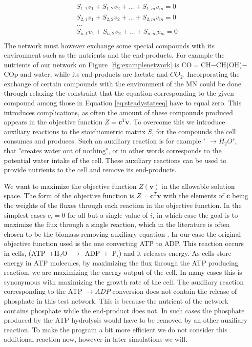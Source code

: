 \documentclass[a4paper,12pt]{article}
\begin{document}
	\begin{equation}\label{eq:steadystateeq}
		\begin{matrix}
			S_{1,1} v_1 + S_{1,2} v_2 + ... + S_{1,m} v_m=0 \\
			S_{2,1} v_1 + S_{2,2} v_2 + ... + S_{2,m} v_m=0 \\
			... \\
			S_{n,1} v_1 + S_{n,2} v_2 + ... + S_{n,m} v_m=0 \\
		\end{matrix}
	\end{equation}
	The network must however exchange some special compounds with its environment such as the nutrients and the end-products. For example the nutrients of our network on Figure~\ref{fig:examplenetwork} is CO$=$CH$-$CH(OH)$-$COp and water, while its end-products are lactate and $CO_2$. Incorporating the exchange of certain compounds with the environment of the MN could be done through relaxing the constraint that the equation corresponding to the given compound among those in Equation \ref{eq:steadystateeq} have to equal zero. This introduces complications, as often the amount of these compounds produced appears in the objective function $Z=\mathbf{c}^T \mathbf{v}$. To overcome this we introduce auxiliary reactions to the stoichiometric matrix $S$, for the compounds the cell consumes and produces. Such an auxiliary reaction is for example " $ \rightarrow H_2O$", that "creates water out of nothing", or in other words corresponds to the potential water intake of the cell. These auxiliary reactions can be used to provide nutrients to the cell and remove its end-products.%


	We want to maximize the objective function $Z \left( \mathbf{v} \right)$ in the allowable solution space.  The form of the objective function is $Z=\mathbf{c}^T \mathbf{v}$ with the elements of $\mathbf{c}$ being the weights of the fluxes through each reaction in the objective function. In the simplest cases $c_i=0$ for all but a single value of $i$, in which case the goal is to maximize the flux through a single reaction, which in the literature is often chosen to be the biomass removing auxiliary equation \cite{whatisfluxbalance}. In our case the original objective function used is the one converting ATP to ADP. This reaction occurs in cells, (ATP~+H$_2$O~$\rightarrow$~ADP~+~P$_i$) and it releases energy. As cells store energy in ATP molecules, by maximizing the flux through the ATP producing reaction, we are maximizing the energy output of the cell. In many cases this is synonymous with maximizing the growth rate of the cell. The auxiliary reaction corresponding to the ATP $\rightarrow ADP$ conversion does not contain the release of phosphate in this test network. This is because the nutrient of the network contains phosphate while the end-product does not. In such cases the phosphate produced by the ATP hydrolysis would have to be removed by an other auxiliary reaction. To make the program a bit more efficient we do not consider this additional reaction now, however in later simulations we will. 
\end{document}
